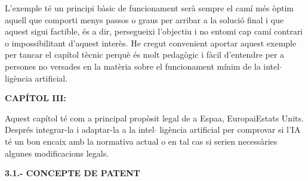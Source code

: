 \documentclass[12pt]{article}
\renewcommand{\_}{\kern-1.5pt\textunderscore\kern-1.5pt}
\begin{document}
\begin{itemize}
\vspace{\baselineskip}
\begin{justify}
L’exemple té un principi bàsic de funcionament serà sempre el camí més òptim aquell que comporti menys passos o graus per arribar a la solució final i que aquest sigui factible, és a dir, persegueixi l’objectiu i no entomi cap camí contrari o impossibilitant d’aquest interès. He cregut convenient aportar aquest exemple per tancar el capítol tècnic perquè és molt pedagògic i fàcil d’entendre per a persones no versades en la matèria sobre el funcionament mínim de la intel$ \cdot $ ligència artificial.
\end{justify}\par


\vspace{\baselineskip}

\vspace{\baselineskip}

\vspace{\baselineskip}
\begin{Center}
{\fontsize{16pt}{19.2pt}\selectfont \textbf{CAPÍTOL III: }\par}
\end{Center}\par


\vspace{\baselineskip}
\begin{justify}
Aquest capítol té com a principal propòsit legal de  a Espaa, EuropaiEstats Units. Després integrar-la i adaptar-la a la intel$ \cdot $ ligència artificial per comprovar si l’IA té un bon encaix amb la normativa actual o en tal cas si serien necessàries algunes modificacions legals. 
\end{justify}\par


\vspace{\baselineskip}
\begin{justify}
\textbf{3.1.- CONCEPTE DE PATENT}
\end{justify}\par



\end{itemize}
\end{document}
